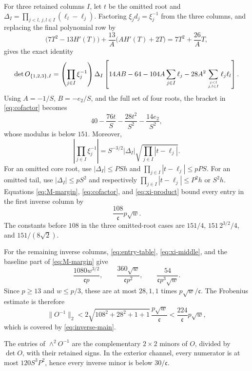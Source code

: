 For three retained columns \(I\), let \(t\) be the omitted root and
\(\Delta_I=\prod_{j<l,\,j,l\in I}(\ell_l-\ell_j)\). Factoring
\(\xi_jd_j=\xi_j^{-1}\) from the three columns, and replacing the final
polynomial row by
\[
 \bigl(7T^2-13H'(T)\bigr)+\frac{13}{A}\bigl(AH'(T)+2T\bigr)
 =7T^2+\frac{26}{A}T,
\]
gives the exact identity
\begin{equation}\label{eq:cofactor}
 \det O_{\{1,2,3\},I}
 =\left(\prod_{j\in I}\xi_j^{-1}\right)\Delta_I
 \left[14AB-64-104A\sum_{j\in I}\ell_j
 -28A^2\sum_{j<l\atop j,l\in I}\ell_j\ell_l\right].
\end{equation}
Using \(A=-1/S\), \(B=-e_2/S\), and the full set of four roots, the bracket
in \eqref{eq:cofactor} becomes
\begin{equation}\label{eq:omitted-bracket}
 40-\frac{76t}{S}-\frac{28t^2}{S^2}-\frac{14e_2}{S^2},
\end{equation}
whose modulus is below \(151\). Moreover,
\begin{equation}\label{eq:xi-product}
 \left|\prod_{j\in I}\xi_j^{-1}\right|
 =S^{-3/2}|\Delta_I|
 \sqrt{\prod_{j\in I}|t-\ell_j|}.
\end{equation}
For an omitted core root, use
\(|\Delta_I|\le PSh\) and
\(\prod_{j\in I}|t-\ell_j|\le pPS\). For an omitted tail, use
\(|\Delta_I|\le pS^2\) and respectively
\(\prod_{j\in I}|t-\ell_j|\le P^2h\) or \(S^2h\).
Equations \eqref{eq:M-margin}, \eqref{eq:cofactor}, and
\eqref{eq:xi-product} bound every entry in the first inverse column by
\begin{equation}\label{eq:first-inverse-column}
 \frac{108}{\mathfrak c}p\sqrt w.
\end{equation}
The constants before \(108\) in the three omitted-root cases are
\(151/4\), \(151\,2^{3/2}/4\), and \(151/(8\sqrt2)\).

For the remaining inverse columns, \eqref{eq:entry-table},
\eqref{eq:xi-middle}, and the baseline part of \eqref{eq:M-margin} give
\[
 \frac{1080w^{3/2}}{\mathfrak c p},\qquad
 \frac{360\sqrt w}{\mathfrak c p^2},\qquad
 \frac{54}{\mathfrak c p^3\sqrt w}.
\]
Since \(p\ge13\) and \(w\le p/3\), these are at most \(28,1,1\) times
\(p\sqrt w/\mathfrak c\). The Frobenius estimate is therefore
\[
 \|O^{-1}\|_2
 <2\sqrt{108^2+28^2+1+1}\,\frac{p\sqrt w}{\mathfrak c}
 <\frac{224}{\mathfrak c}p\sqrt w,
\]
which is covered by \eqref{eq:inverse-main}.

The entries of \(\wedge^2O^{-1}\) are the complementary \(2\times2\)
minors of \(O\), divided by \(\det O\), with their retained signs. In the
exterior channel, every numerator is at most \(120S^3P^2\), hence every
inverse minor is below \(30/\mathfrak c\).

